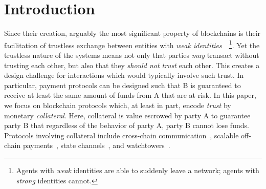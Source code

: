 \documentclass[runningheads]{llncs}
\newcommand{\dom}[1]{\todo[linecolor=green,backgroundcolor=green!25,bordercolor=green,inline,caption={}]{Comment by Dominik: #1}}
\begin{document}
\section{Introduction}
\label{sec:intro}


Since their creation, arguably the most significant property of blockchains is their facilitation of trustless exchange between entities with \emph{weak identities}~\cite{rainer}~\footnote{Agents with \emph{weak} identities are able to suddenly leave a network; agents with \emph{strong} identities cannot.}.
Yet the trustless nature of the systems means not only that parties \textit{may} transact without trusting each other, but also that they \textit{should not trust} each other.
This creates a design challenge for interactions which would typically involve such trust. 
In particular, payment protocols can be designed such that B is guaranteed to receive at least the same amount of funds from A that are at risk.
In this paper, we focus on blockchain protocols which, at least in part, encode \textit{trust} by monetary \textit{collateral}.
Here, collateral is value escrowed by party A to guarantee party B that regardless of the behavior of party A, party B cannot lose funds. 
Protocols involving collateral include cross-chain communication~\cite{Zamyatin2019XCLAIM}, scalable off-chain payments~\cite{Khalil2019NOCUST}, state channels~\cite{dziembowski2018general}, and watchtowers~\cite{mccorry2018pisa}.
\end{document}

